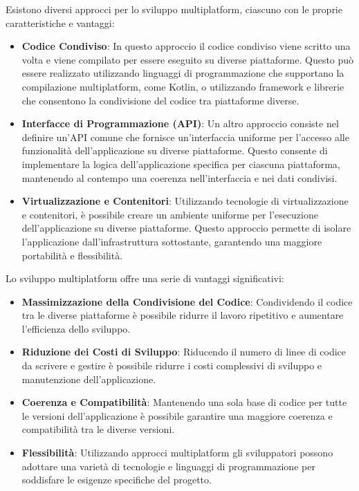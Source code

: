 \documentclass[12pt,a4paper,openright,twoside]{book}
\begin{document}
Esistono diversi approcci per lo sviluppo multiplatform, ciascuno con le proprie caratteristiche e vantaggi:
\begin{itemize}
\item \textbf{Codice Condiviso}: In questo approccio il codice condiviso viene scritto una volta e viene compilato per essere eseguito
 su diverse piattaforme. Questo può essere realizzato utilizzando linguaggi di programmazione che supportano la compilazione multiplatform, 
 come Kotlin, o utilizzando framework e librerie che consentono la condivisione del codice tra piattaforme diverse.
\item \textbf{Interfacce di Programmazione (API)}: Un altro approccio consiste nel definire un'API comune che fornisce un'interfaccia uniforme
 per l'accesso alle funzionalità dell'applicazione su diverse piattaforme. Questo consente di implementare la logica dell'applicazione specifica 
 per ciascuna piattaforma, mantenendo al contempo una coerenza nell'interfaccia e nei dati condivisi.
\item \textbf{Virtualizzazione e Contenitori}: Utilizzando tecnologie di virtualizzazione e contenitori, è possibile creare un ambiente uniforme 
per l'esecuzione dell'applicazione su diverse piattaforme. Questo approccio permette di isolare l'applicazione dall'infrastruttura sottostante, 
garantendo una maggiore portabilità e flessibilità.
\end{itemize}

Lo sviluppo multiplatform offre una serie di vantaggi significativi:
\begin{itemize}
\item \textbf{Massimizzazione della Condivisione del Codice}: Condividendo il codice tra le diverse piattaforme 
è possibile ridurre il lavoro ripetitivo e aumentare l'efficienza dello sviluppo.
\item \textbf{Riduzione dei Costi di Sviluppo}: Riducendo il numero di linee di codice da scrivere e gestire 
è possibile ridurre i costi complessivi di sviluppo e manutenzione dell'applicazione.
\item \textbf{Coerenza e Compatibilità}: Mantenendo una sola base di codice per tutte le versioni dell'applicazione 
è possibile garantire una maggiore coerenza e compatibilità tra le diverse versioni.
\item \textbf{Flessibilità}: Utilizzando approcci multiplatform gli sviluppatori possono adottare una varietà di tecnologie e 
linguaggi di programmazione per soddisfare le esigenze specifiche del progetto.
\end{itemize}
\end{document}
